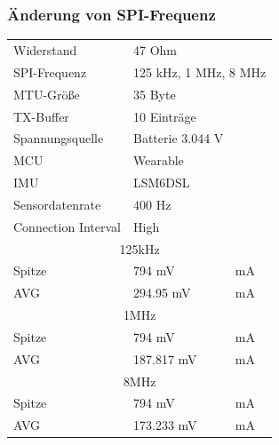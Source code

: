 \subsubsection{Änderung von SPI-Frequenz}
\begin{minipage}{\linewidth}
	\label{tab:aaaaaaaaaaaaaaaa}
	\begin{tabularx}{\linewidth}{|l|l|X|}
		Widerstand & \multicolumn{2}{l|}{47 Ohm}\\
    SPI-Frequenz & \multicolumn{2}{l|}{125 kHz, 1 MHz, 8 MHz}\\
    MTU-Größe & \multicolumn{2}{l|}{35 Byte}\\
    TX-Buffer & \multicolumn{2}{l|}{10 Einträge}\\
    Spannungsquelle & \multicolumn{2}{l|}{Batterie 3.044 V}\\
    MCU & \multicolumn{2}{l|}{Wearable}\\
    IMU & \multicolumn{2}{l|}{LSM6DSL}\\
    Sensordatenrate & \multicolumn{2}{l|}{400 Hz}\\
    Connection Interval & \multicolumn{2}{l|}{High}\\
    \hline
    \multicolumn{3}{|c|}{125kHz}\\
    Spitze & 794 mV & mA\\
    AVG & 294.95 mV & mA\\
    \hline
    \multicolumn{3}{|c|}{1MHz}\\
    Spitze & 794 mV & mA\\
    AVG & 187.817 mV & mA\\
    \hline
    \multicolumn{3}{|c|}{8MHz}\\
    Spitze & 794 mV & mA\\
    AVG & 173.233 mV & mA\\
  \end{tabularx}
\end{minipage}\\\\

